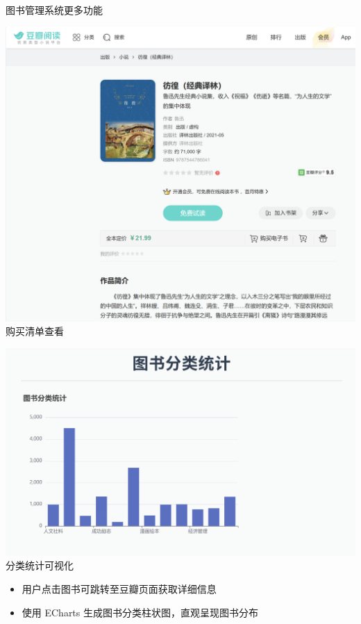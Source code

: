 \documentclass{ctexbeamer}
\begin{document}
\begin{frame}{图书管理系统更多功能}
  \centering
  \begin{minipage}{0.45\textwidth}
    \includegraphics[width=\textwidth]{fig/book5.png}\\ 购买清单查看
  \end{minipage}
  \begin{minipage}{0.45\textwidth}
    \includegraphics[width=\textwidth]{fig/book6.png}\\ 分类统计可视化
  \end{minipage}
  \vspace{0.3cm}
  \begin{itemize}
    \item 用户点击图书可跳转至豆瓣页面获取详细信息
    \item 使用 ECharts 生成图书分类柱状图，直观呈现图书分布
  \end{itemize}
\end{frame}
\end{document}
